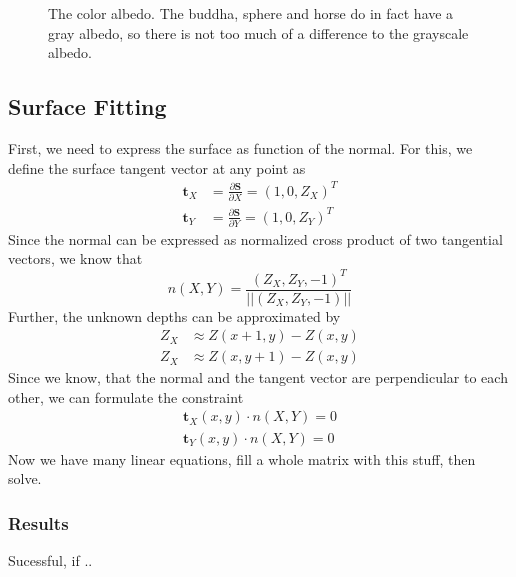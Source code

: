 \documentclass{paper}
\begin{document}
\begin{figure}[h!]
\begin{subfigure}{0.3\textwidth}
        \end{subfigure}
        \caption{The color albedo. The buddha, sphere and horse
        do in fact have a gray albedo, so there is not too much
        of a difference to the grayscale albedo.}
        \label{fig:color_albedo}
\end{figure}

\subsection{Surface Fitting}

First, we need to express the surface as function of the normal. For this, we define the surface tangent
vector at any point as
\begin{equation}
\begin{aligned}
	\textbf{t}_X &= \frac{\partial\textbf{S}}{\partial X} = (1, 0, Z_X)^T \\
	\textbf{t}_Y &= \frac{\partial\textbf{S}}{\partial Y} = (1, 0, Z_Y)^T
\end{aligned}
\end{equation}
Since the normal can be expressed as normalized cross product of two tangential vectors, we know that
\begin{equation}
	n(X,Y) = \frac{(Z_X, Z_Y, -1)^T}{||(Z_X, Z_Y, -1)||}
\end{equation}
Further, the unknown depths can be approximated by
\begin{equation}
\begin{aligned}
	Z_X &\approx Z(x + 1, y) - Z(x,y) \\
	Z_X &\approx Z(x, y + 1) - Z(x,y)	
\end{aligned}
\label{eq:approx}
\end{equation}
Since we know, that the normal and the tangent vector are perpendicular to each other, we can
formulate the constraint
\begin{equation}
\begin{aligned}
	\textbf{t}_X(x,y) \cdot n(X,Y) = 0 \\
	\textbf{t}_Y(x,y) \cdot n(X,Y) = 0
\end{aligned}
\end{equation}
Now we have many linear equations, fill a whole matrix with this stuff, then solve.
\subsubsection{Results}
Sucessful, if ..
\end{document}
